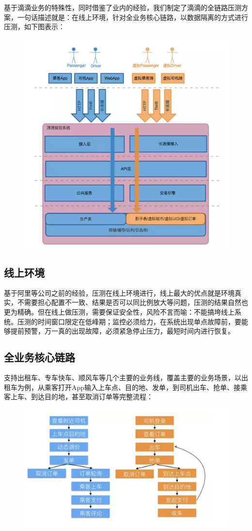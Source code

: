 \documentclass[12pt]{article}
\begin{document}
基于滴滴业务的特殊性，同时借鉴了业内的经验，我们制定了滴滴的全链路压测方案，一句话描述就是：在线上环境，针对全业务核心链路，以数据隔离的方式进行压测，如下图表示：
\begin{figure}[H]
    \centering
    \includegraphics[width=.8\textwidth]{fig/DIDI_Pressure_2.png}
\end{figure}

\subsection{线上环境}
基于阿里等公司之前的经验，压测在线上环境进行，线上最大的优点就是环境真实，不需要担心配置不一致、结果是否可以同比例放大等问题，压测的结果自然也更为精确。但在线上做压测，需要保证安全性，风险不言而喻：不能搞垮线上系统。压测的时间窗口限定在低峰期；监控必须给力，在系统出现单点故障前，要能够提前预警，万一真的出现故障，必须紧急停止压力，最短时间内进行恢复。

\subsection{全业务核心链路}
支持出租车、专车快车、顺风车等几个主要的业务线，覆盖主要的业务场景，以出租车为例，从乘客打开App输入上车点、目的地、发单，到司机出车、抢单、接乘客上车、到达目的地，甚至取消订单等完整流程：
\begin{figure}[H]
    \centering
    \includegraphics[width=.8\textwidth]{fig/DIDI_Pressure_3.png}
\end{figure}
\end{document}
